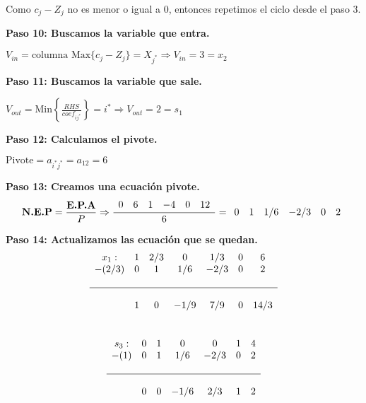 \documentclass{templateNote}
\begin{document}
Como $c_j - Z_j$ no es menor o igual a 0, entonces repetimos el ciclo desde el paso 3.

\textbf{Paso 10: Buscamos la variable que entra.}
\begin{center}
    $V_{in} = \text{columna Max} \{c_j-Z_j\} = X_{j^*} \Rightarrow V_{in} = 3= x_2$
\end{center}

\textbf{Paso 11: Buscamos la variable que sale.}
\begin{center}
    $V_{out} = \text{Min} \left\{ \frac{RHS}{coef_{ij^*}} \right\} = i^* \Rightarrow V_{out} = 2 = s_1$
\end{center}

\textbf{Paso 12: Calculamos el pivote.}
\begin{center}
    $\text{Pivote} = a_{i^*j^*} = a_{12} = 6$
\end{center}

\textbf{Paso 13: Creamos una ecuación pivote.}
\begin{equation*}
    \textbf{N.E.P} = \frac{\textbf{E.P.A}}{P} \\
    \Rightarrow \frac{\begin{array}{cccccc} 0 & 6 & 1 & -4 & 0 & 12 \end{array}}{6} = \begin{array}{cccccc} 0 & 1 & 1/6 & -2/3 & 0 & 2 \end{array}
\end{equation*}

\textbf{Paso 14: Actualizamos las ecuación que se quedan.}
\begin{equation*}
    \begin{array}{ccccccc}
        x_1: & 1 & 2/3 & 0 & 1/3 & 0 & 6 \\
        -(2/3) & 0 & 1 & 1/6 & -2/3 & 0 & 2 \\
        \\ \hline \\
        & 1 & 0 & -1/9 & 7/9 & 0 & 14/3 
    \end{array}
\end{equation*}
\\
\begin{equation*}
    \begin{array}{ccccccc}
        s_3: & 0 & 1 & 0 & 0 & 1 & 4 \\
        -(1) & 0 & 1 & 1/6 & -2/3 & 0 & 2 \\
        \\ \hline \\
        & 0 & 0 & -1/6 & 2/3 & 1 & 2
    \end{array}
\end{equation*}
\end{document}

